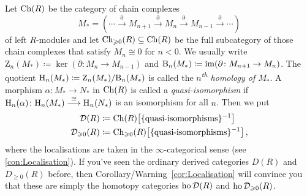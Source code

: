 \begin{numpar}\label{con:DerivedCategoryI}%
	Let $\operatorname{Ch}(R)$ be the category of chain complexes
	\begin{equation*}
		M_*=\left(\dotsb \overset{\partial}{\longrightarrow} M_{n+1}\overset{\partial}{\longrightarrow} M_n\overset{\partial}{\longrightarrow} M_{n-1}\overset{\partial}{\longrightarrow}\dotsb\right)
	\end{equation*}
	of left $R$-modules and let $\operatorname{Ch}_{\geqslant 0}(R)\subseteq \operatorname{Ch}(R)$ be the full subcategory of those chain complexes that satisfy $M_n\cong 0$ for $n<0$. We usually write $\mathrm Z_n(M_*)\coloneqq \ker(\partial\colon M_n\rightarrow M_{n-1})$ and $\mathrm B_n(M_*)\coloneqq \operatorname{im}(\partial\colon M_{n+1}\rightarrow M_n)$. The quotient $\mathrm{H}_n(M_*)\coloneqq \mathrm Z_n(M_*)/\mathrm B_n(M_*)$ is called the \emph{$n$\textsuperscript{th} homology of $M_*$}. A morphism $\alpha\colon M_*\rightarrow N_*$ in $\operatorname{Ch}(R)$ is called a \emph{quasi-isomorphism} if $\mathrm{H}_n(\alpha)\colon \mathrm{H}_n(M_*)\overset{\cong}{\longrightarrow} \mathrm{H}_n(N_*)$ is an isomorphism for all $n$. Then we put
	\begin{align*}
		\Dd(R)&\coloneqq \Ch(R)\left[\{\text{quasi-isomorphisms}\}^{-1}\right]\\
		\Dd_{\geqslant 0}(R)&\coloneqq \Ch_{\geqslant 0}(R)\left[\{\text{quasi-isomorphisms}\}^{-1}\right]\,,
	\end{align*}
	where the localisations are taken in the $\infty$-categorical sense (see \cref{con:Localisation}). If you've seen the ordinary derived categories $D(R)$ and $D_{\geqslant 0}(R)$ before, then Corollary/Warning~\cref{cor:Localisation} will convince you that these are simply the homotopy categories $\operatorname{ho}\mathcal{D}(R)$ and $\operatorname{ho}\mathcal{D}_{\geqslant 0}(R)$.
	

\end{numpar}
